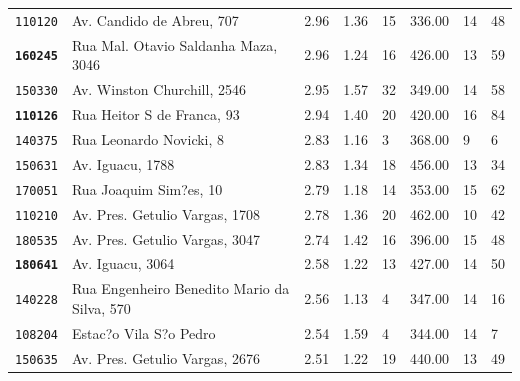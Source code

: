 \begin{table}[htb]
\begin{tabular} {p{1.5cm}p{4.0cm}p{1.5cm}p{1.5cm}p{1.5cm}p{1.5cm}p{1.5cm}p{1.5cm} }
    \texttt{110120} &                    Av. Candido de Abreu, 707  &              2.96 &                   1.36 &       15 &        336.00 &          14 &          48 \\
    \textbf{\texttt{160245}} &          Rua Mal. Otavio Saldanha Maza, 3046  &              2.96 &                   1.24 &       16 &        426.00 &          13 &          59 \\
    \texttt{150330} &                  Av. Winston Churchill, 2546  &              2.95 &                   1.57 &       32 &        349.00 &          14 &          58 \\
    \textbf{\texttt{110126}} &                   Rua Heitor S de Franca, 93  &              2.94 &                   1.40 &       20 &        420.00 &          16 &          84 \\
    \texttt{140375} &                      Rua Leonardo Novicki, 8  &              2.83 &                   1.16 &        3 &        368.00 &           9 &           6 \\
    \texttt{150631} &                             Av. Iguacu, 1788  &              2.83 &                   1.34 &       18 &        456.00 &          13 &          34 \\
    \texttt{170051} &                       Rua Joaquim Sim?es, 10  &              2.79 &                   1.18 &       14 &        353.00 &          15 &          62 \\
    \texttt{110210} &               Av. Pres. Getulio Vargas, 1708  &              2.78 &                   1.36 &       20 &        462.00 &          10 &          42 \\
    \texttt{180535} &               Av. Pres. Getulio Vargas, 3047  &              2.74 &                   1.42 &       16 &        396.00 &          15 &          48 \\
    \textbf{\texttt{180641}} &                             Av. Iguacu, 3064  &              2.58 &                   1.22 &       13 &        427.00 &          14 &          50 \\
    \texttt{140228} &  Rua Engenheiro Benedito Mario da Silva, 570  &              2.56 &                   1.13 &        4 &        347.00 &          14 &          16 \\
    \texttt{108204} &                        Estac?o Vila S?o Pedro &              2.54 &                   1.59 &        4 &        344.00 &          14 &           7 \\
    \texttt{150635} &               Av. Pres. Getulio Vargas, 2676  &              2.51 &                   1.22 &       19 &        440.00 &          13 &          49 \\

\end{tabular}
\end{table}

